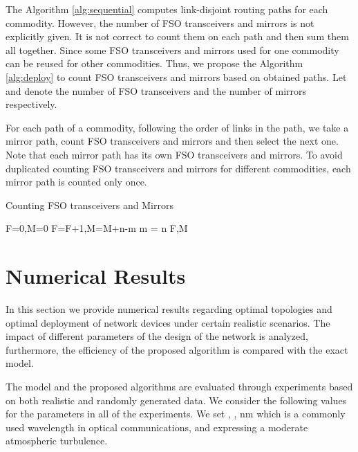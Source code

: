 \documentclass[onecolumn,11pt,draftclsnofoot]{IEEEtran}
\begin{document}
The Algorithm \ref{alg:sequential} computes  link-disjoint routing paths for each commodity. However, the number of FSO transceivers and mirrors is not explicitly given. It is not correct to count them on each path and then sum them all together. Since some FSO transceivers and mirrors used for one commodity can be reused for other commodities.
Thus, we propose the Algorithm \ref{alg:deploy} to count FSO transceivers and mirrors based on obtained paths. Let  and  denote the number of FSO transceivers and the number of mirrors respectively.

For each path of a commodity, following the order of links in the path, we take a mirror path, count FSO transceivers and mirrors and then select the next one. Note that each mirror path has its own FSO transceivers and mirrors.
To avoid duplicated counting FSO transceivers and mirrors for different commodities, each mirror path is counted only  once.

\begin{algorithm}
\caption{Counting FSO transceivers and Mirrors}
\label{alg:deploy}
\begin{algorithmic}[1]
\REQUIRE 
    \STATE F=0,M=0
    \FORALL{}
	  \FORALL{}
          \FOR{}
              \FOR{}
                  \IF{}
                          \STATE F=F+1,M=M+n-m
                          \STATE m = n
                      \ENDIF
                  \ENDIF
              \ENDFOR
          \ENDFOR
      \ENDFOR
     \ENDFOR
\RETURN F,M
\end{algorithmic}
\end{algorithm}

\section{Numerical Results} \label{sec:numerical}
In this section we provide numerical results regarding optimal topologies and optimal deployment of network devices under certain realistic scenarios. The impact of different parameters of the design of the network is analyzed, furthermore, the efficiency of the proposed algorithm is compared with the exact model.

The model and the proposed algorithms are evaluated through experiments based on both realistic and randomly generated data. We consider the following values for the parameters in all of the experiments. We set , ,   nm which is a commonly used wavelength in optical communications, and   expressing a moderate atmospheric turbulence.
\end{document}
